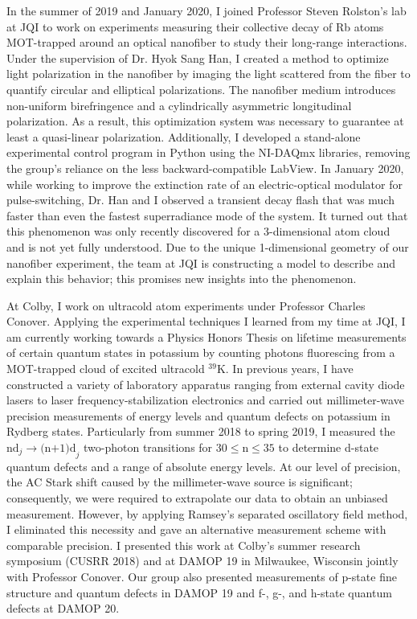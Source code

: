\documentclass[12pt]{article}
\begin{document}
In the summer of 2019 and January 2020, I joined Professor Steven Rolston's lab at JQI to work on  experiments measuring their collective decay of Rb atoms MOT-trapped around an optical nanofiber to study their long-range interactions. Under the supervision of Dr. Hyok Sang Han, I created a method to optimize light polarization in the nanofiber by imaging the light scattered from the fiber to quantify circular and elliptical polarizations. The nanofiber medium introduces non-uniform birefringence and a cylindrically asymmetric longitudinal polarization. As a result, this optimization system was necessary to guarantee at least a quasi-linear polarization. Additionally, I developed a stand-alone experimental control program in Python using the NI-DAQmx libraries, removing the group's reliance on the less backward-compatible LabView. In January 2020, while working to improve the extinction rate of an electric-optical modulator for pulse-switching, Dr. Han and I observed a transient decay flash that was much faster than even the fastest superradiance mode of the system. It turned out that this phenomenon was only recently discovered for a 3-dimensional atom cloud and is not yet fully understood. Due to the unique 1-dimensional geometry of our nanofiber experiment, the team at JQI is constructing a model to describe and explain this behavior; this promises new insights into the phenomenon.  \\ \vspace{-9pt}

At Colby, I work on ultracold atom experiments under Professor Charles Conover. Applying the experimental techniques I learned from my time at JQI, I am currently working towards a Physics Honors Thesis on lifetime measurements of certain quantum states in potassium by counting photons fluorescing from a MOT-trapped cloud of excited ultracold $^{39}$K. In previous years, I have constructed a variety of laboratory apparatus ranging from external cavity diode lasers to laser frequency-stabilization electronics and carried out millimeter-wave precision measurements of energy levels and quantum defects on potassium in Rydberg states. Particularly from summer 2018 to spring 2019, I measured the $\mbox{nd}_{j} \to \mbox{(n+1)d}_{j}$ two-photon transitions for $\mbox{30} \leq \mbox{n} \leq \mbox{35}$ to determine d-state quantum defects and a range of absolute energy levels. At our level of precision, the AC Stark shift caused by the millimeter-wave source is significant; consequently, we were required to extrapolate our data to obtain an unbiased measurement. However, by applying Ramsey's separated oscillatory field method, I eliminated this necessity and gave an alternative measurement scheme with comparable precision. I presented this work at Colby's summer research symposium (CUSRR 2018) and at DAMOP 19 in Milwaukee, Wisconsin jointly with Professor Conover. Our group also presented measurements of p-state fine structure and quantum defects in DAMOP 19 and f-, g-, and h-state quantum defects at DAMOP 20. \\ \vspace{-9pt}
\end{document}
